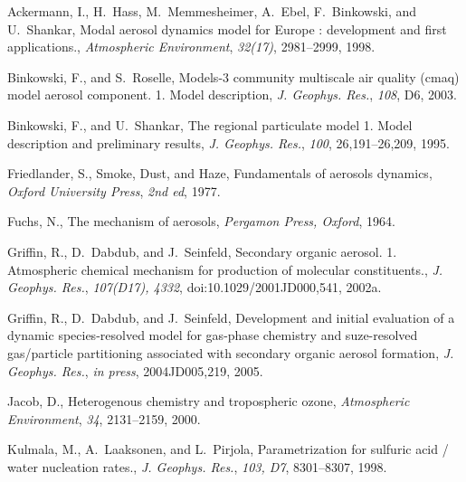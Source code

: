 Ackermann, I., H.~Hass, M.~Memmesheimer, A.~Ebel, F.~Binkowski, and U.~Shankar,
  Modal aerosol dynamics model for {E}urope : development and first
  applications., {\it Atmospheric Environment\/}, {\it 32(17)\/}, 2981--2999,
  1998.

Binkowski, F., and S.~Roselle, Models-3 community multiscale air quality (cmaq)
  model aerosol component. 1. {M}odel description, {\it J. Geophys. Res.\/},
  {\it 108\/}, D6, 2003.

Binkowski, F., and U.~Shankar, The regional particulate model 1. {M}odel
  description and preliminary results, {\it J. Geophys. Res.\/}, {\it 100\/},
  26,191--26,209, 1995.

Friedlander, S., {S}moke, {D}ust, and {H}aze, {F}undamentals of aerosols
  dynamics, {\it Oxford University Press\/}, {\it 2nd ed\/}, 1977.

Fuchs, N., The mechanism of aerosols, {\it Pergamon Press, Oxford\/}, 1964.

Griffin, R., D.~Dabdub, and J.~Seinfeld, Secondary organic aerosol. 1.
  {A}tmospheric chemical mechanism for production of molecular constituents.,
  {\it J. Geophys. Res.\/}, {\it 107(D17), 4332\/}, doi:10.1029/2001JD000,541,
  2002a.

Griffin, R., D.~Dabdub, and J.~Seinfeld, Development and initial evaluation of
  a dynamic species-resolved model for gas-phase chemistry and suze-resolved
  gas/particle partitioning associated with secondary organic aerosol
  formation, {\it J. Geophys. Res.\/}, {\it in press\/}, 2004JD005,219, 2005.

Jacob, D., Heterogenous chemistry and tropospheric ozone, {\it Atmospheric
  Environment\/}, {\it 34\/}, 2131--2159, 2000.

Kulmala, M., A.~Laaksonen, and L.~Pirjola, Parametrization for sulfuric acid /
  water nucleation rates., {\it J. Geophys. Res.\/}, {\it 103, D7\/},
  8301--8307, 1998.

